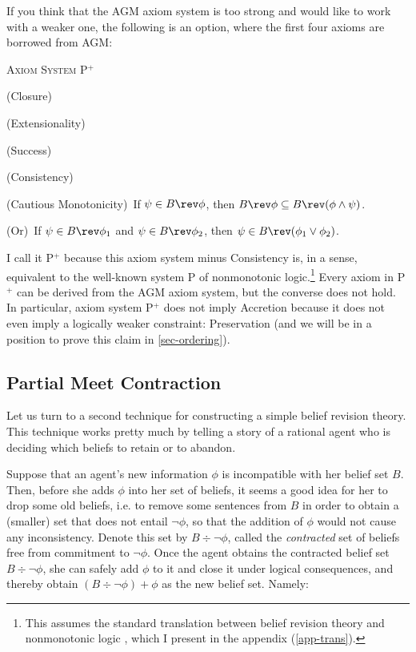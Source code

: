 If you think that the AGM axiom system is too strong and would like to work with a weaker one, the following is an option, where the first four axioms are borrowed from AGM: \op

	\xm \textsc{Axiom System P$^{+}$}

	\xm (Closure)
	
	\xm (Extensionality)
	
	\xm (Success)
	
	\xm (Consistency) 
	
	\xm (Cautious Monotonicity)\, If $\psi \in B \rev \phi$, then $B \rev \phi \subseteq B \rev (\phi \wedge \psi)$.

	\xm (Or)\, If $\psi \in B \rev \phi_1$ and $\psi \in B \rev \phi_2$, then $\psi \in B \rev (\phi_1 \vee \phi_2)$.

\ed I call it P$^{+}$ because this axiom system minus Consistency is, in a sense, equivalent to the well-known system P of nonmonotonic logic.\footnote
	{
	This assumes the standard translation between belief revision theory and nonmonotonic logic \citep*{makinson1991relations}, which I present in the appendix (\autoref{app-trans}).
	}
Every axiom in P$^+$ can be derived from the AGM axiom system, but the converse does not hold. In particular, axiom system P$^+$ does not imply Accretion because it does not even imply a logically weaker constraint: Preservation (and we will be in a position to prove this claim in \autoref{sec-ordering}).

\subsection{Partial Meet Contraction}\label{sec-contraction}

Let us turn to a second technique for constructing a simple belief revision theory. This technique works pretty much by telling a story of a rational agent who is deciding which beliefs to retain or to abandon. 

Suppose that an agent's new information $\phi$ is incompatible with her belief set $B$. Then, before she adds $\phi$ into her set of beliefs, it seems a good idea for her to drop some old beliefs, i.e. to remove some sentences from $B$ in order to obtain a (smaller) set that does not entail $\neg\phi$, so that the addition of $\phi$ would not cause any inconsistency. Denote this set by $B \div \neg\phi$, called the {\em contracted} set of beliefs free from commitment to $\neg \phi$. Once the agent obtains the contracted belief set $B \div \neg\phi$, she can safely add $\phi$ to it and close it under logical consequences, and thereby obtain $(B \div \neg\phi) + \phi$ as the new belief set. Namely:\op

